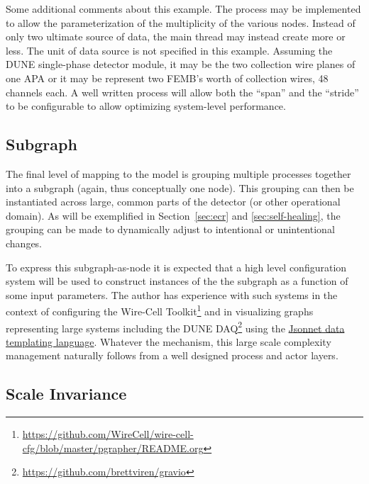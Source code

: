 \documentclass[letterpaper,oneside]{memoir}
\begin{document}
Some additional comments about this example. 
The process may be implemented to allow the parameterization of the multiplicity of the various nodes. 
Instead of only two ultimate source of data, the main thread may instead create more or less. 
The unit of data source is not specified in this example. 
Assuming the DUNE single-phase detector module, it may be the two collection wire planes of one APA or it may be represent two FEMB's worth of collection wires, 48 channels each. 
A well written process will allow both the ``span'' and the ``stride'' to be configurable to allow optimizing system-level performance.

\subsection{Subgraph}

The final level of mapping to the model is grouping multiple processes together into a subgraph (again, thus conceptually one node). 
This grouping can then be instantiated across large, common parts of the detector (or other operational domain). 
As will be exemplified in Section~\ref{sec:ecr} and \ref{sec:self-healing}, the grouping can be made to dynamically adjust to intentional or unintentional changes.

To express this subgraph-as-node it is expected that a high level configuration system will be used to construct instances of the the subgraph as a function of some input parameters. 
The author has experience with such systems in the context of configuring the Wire-Cell Toolkit\footnote{\url{https://github.com/WireCell/wire-cell-cfg/blob/master/pgrapher/README.org}} and in visualizing graphs representing large systems including the DUNE DAQ\footnote{\url{https://github.com/brettviren/gravio}} using the \href{https://jsonnet.org/}{Jsonnet data templating language}. 
Whatever the mechanism, this large scale complexity management naturally follows from a well designed process and actor layers.

\subsection{Scale Invariance}
\end{document}
